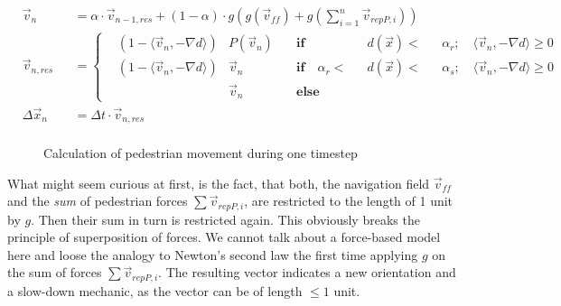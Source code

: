 \begin{align*}
&\vec{v}_{n}&&= \alpha\cdot\vec{v}_{n-1, res} + (1 - \alpha)\cdot g\left(g(\vec{v}_{ff})+g(\sum_{i=1}^n\vec{v}_{repP,i})\right)\\
&\vec{v}_{n, res}&&= \left\{
	\begin{aligned}
        &\left(1-\langle\vec{v}_{n},-\nabla d\rangle\right)  & P(\vec{v}_{n}) \quad & \textbf{if} \quad  && d(\vec{x}) < && \alpha_{r}; \quad \langle\vec{v}_{n},-\nabla d\rangle \ge 0 \\
        &\left(1-\langle\vec{v}_{n},-\nabla d\rangle\right)  & \vec{v}_{n} \quad  & \textbf{if} \quad \alpha_{r} <   && d(\vec{x}) < && \alpha_{s} ;\quad \langle\vec{v}_{n},-\nabla d\rangle \ge 0\\
		& &\vec{v}_{n} \quad & \textbf{else} &&   &&%
	\end{aligned}
	\right.\\
&\Delta\vec{x}_{n}&&= \Delta t\cdot\vec{v}_{n, res}\\
\end{align*}
\newpage
%
\begin{figure}[h!]

%
\caption{Calculation of pedestrian movement during one timestep}
\end{figure}
\newpage

What might seem curious at first, is the fact, that both, the navigation field $\vec{v}_{ff}$ and the \emph{sum} of pedestrian forces $\sum\vec{v}_{repP,i} $, are restricted to the length of 1 unit by $g$. Then their sum in turn is restricted again. This obviously breaks the principle of superposition of forces. We cannot talk about a force-based model here and loose the analogy to Newton's second law the first time applying $g$ on the sum of forces $\sum\vec{v}_{repP,i}$. The resulting vector indicates a new orientation and a slow-down mechanic, as the vector can be of length $ \le 1 $ unit.


